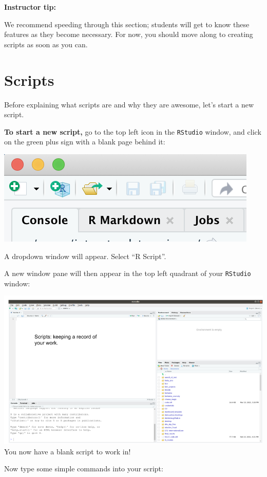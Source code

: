 \documentclass[]{book}
\begin{document}
\leavevmode\hypertarget{tip-text}{}%
\textbf{Instructor tip:}

We recommend speeding through this section; students will get to know these features as they become necessary. For now, you should move along to creating scripts as soon as you can.

\hypertarget{scripts}{%
\section*{Scripts}\label{scripts}}

Before explaining what scripts are and why they are awesome, let's start a new script.

\textbf{To start a new script,} go to the top left icon in the \texttt{RStudio} window, and click on the green plus sign with a blank page behind it:

\includegraphics{img/rstudio_newscript.png}

A dropdown window will appear. Select ``R Script''.

A new window pane will then appear in the top left quadrant of your \texttt{RStudio} window:

\includegraphics{img/rstudio_scripts.png}
You now have a blank script to work in!

Now type some simple commands into your script:
\end{document}

